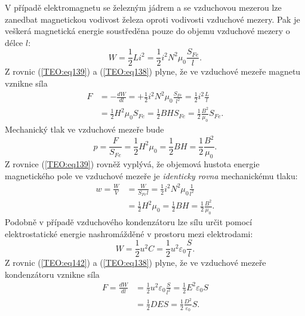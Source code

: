       V případě elektromagnetu se železným jádrem a se vzduchovou mezerou lze zanedbat magnetickou
      vodivost železa oproti vodivosti vzduchové mezery. Pak je veškerá magnetická energie 
      soustředěna pouze do objemu vzduchové mezery o délce \(l\):
      \begin{equation}\label{TEO:eq139}
        W =\frac{1}{2}Li^2 = \frac{1}{2}i^2N^2\mu_0\frac{S_{Fe}}{l}.
      \end{equation}
      Z rovnic (\ref{TEO:eq139}) a (\ref{TEO:eq138}) plyne, že ve vzduchové mezeře 
      magnetu vznikne síla
      \begin{align}\label{TEO:eq140}
         F &= -\frac{dW}{dl} 
            = +\frac{1}{2}i^2N^2\mu_0\frac{S_{Fe}}{l^2}
            =  \frac{1}{2}i^2\frac{L}{l}                                                \nonumber \\
           &=  \frac{1}{2}H^2\mu_0S_{Fe}=\frac{1}{2}BHS_{Fe} 
            =  \frac{1}{2}\frac{B^2}{\mu_0}S_{Fe}.
      \end{align}
      Mechanický tlak ve vzduchové mezeře bude
      \begin{equation}\label{TEO:eq141}
        p = \frac{F}{S_{Fe}} = \frac{1}{2}H^2\mu_0 = \frac{1}{2}BH = \frac{1}{2}\frac{B^2}{\mu_0}.
      \end{equation}
      Z rovnice (\ref{TEO:eq139}) rovněž vyplývá, že objemová hustota energie magnetického 
      pole ve vzduchové mezeře je \emph{identicky rovna} mechanickému tlaku:
      \begin{align*}
        w  = \frac{W}{V} 
          &= \frac{W}{S_{Fe}l} = \frac{1}{2}i^2N^2\mu_0\frac{1}{l^2}              \\
          &= \frac{1}{2}H^2\mu_0 = \frac{1}{2}BH = \frac{1}{2}\frac{B^2}{\mu_0}.
      \end{align*}
      Podobně v případě vzduchového kondenzátoru lze sílu určit pomocí elektrostatické energie 
      nashromážděné v prostoru mezi elektrodami:
      \begin{equation}\label{TEO:eq142}
        W = \frac{1}{2}u^2C = \frac{1}{2}u^2\varepsilon_0\frac{S}{l}.
      \end{equation}
      Z rovnic (\ref{TEO:eq142}) a (\ref{TEO:eq138}) plyne, že ve vzduchové mezeře 
      kondenzátoru vznikne síla
      \begin{align*}
        F  = \frac{dW}{dl} 
          &= \frac{1}{2}u^2\varepsilon_0\frac{S}{l^2}
           = \frac{1}{2}E^2\varepsilon_0S                                  \\
          &= \frac{1}{2}DES           
           = \frac{1}{2}\frac{D^2}{\varepsilon_0}S.
      \end{align*}
